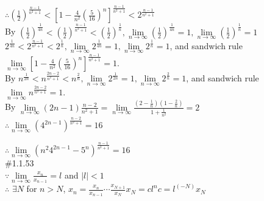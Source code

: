 \documentclass{article}
\begin{document}
$\therefore$\qquad$\left(\frac{1}{2}\right)^{\frac{n-1}{n^2+1}}<\left[1-\frac{4}{n^2}\left(\frac{5}{16}\right)^n\right]^{\frac{n-1}{n^2+1}}<2^{\frac{n-1}{n^2+1}}$\\

By $\left(\frac{1}{2}\right)^{\frac{1}{4n}}<\left(\frac{1}{2}\right)^{\frac{n-1}{n^2+1}}<\left(\frac{1}{2}\right)^{\frac{1}{n}}, \lim \limits_{n \to \infty}\left(\frac{1}{2}\right)^{\frac{1}{4n}} = 1, \lim \limits_{n \to \infty}\left(\frac{1}{2}\right)^{\frac{1}{n}}=1$\\

\qquad $2^{\frac{1}{4n}}<2^{\frac{n-1}{n^2+1}}<2^{\frac{1}{n}}, \lim \limits_{n \to \infty}2^{\frac{1}{4n}} = 1, \lim \limits_{n \to \infty}2^{\frac{1}{n}}=1$, and sandwich rule\\

$\lim \limits_{n \to \infty}\left[1-\frac{4}{n^2}\left(\frac{5}{16}\right)^n\right]^{\frac{n-1}{n^2+1}} = 1$.\\

By
$n^{\frac{1}{2n}}<n^{\frac{2n-2}{n^2+1}}<n^{\frac{2}{n}}, \lim \limits_{n \to \infty}2^{\frac{1}{2n}} = 1, \lim \limits_{n \to \infty}2^{\frac{2}{n}}=1$, and sandwich rule\\

$\lim \limits_{n \to \infty}n^{\frac{2n-2}{n^2+1}}=1$.\\

By
$\lim \limits_{n \to \infty}(2n-1)\frac{n-2}{n^2+1}=\lim \limits_{n \to \infty}\frac{\left(2-\frac{1}{n}\right)\left(1-\frac{2}{n}\right)}{1+\frac{1}{n^2}} = 2$\\

$\therefore$\qquad $\lim \limits_{n \to \infty}\left(4^{2n-1}\right)^{\frac{n-2}{n^2+1}} = 16$\\

\vspace{3.5mm}

$\therefore$\qquad $\lim \limits_{n \to \infty}\left(n^{2}4^{2n-1}-5^n\right)^{\frac{n-1}{n^2+1}} =16$\\

\textcolor[rgb]{0.00,0.00,0.50}{\#1.1.53}\\

$\because$\qquad$\lim \limits_{n \to \infty}\frac{x_n}{x_{n-1}} = l$ and $|l|<1$\\

$\therefore$ \qquad $\exists N$ for $n>N$, $x_n=\frac{x_n}{x_{n-1}}\cdots\frac{x_{N+1}}{x_N}x_N=cl^n$\qquad$c=l^(-N)x_N$\\
\end{document}
